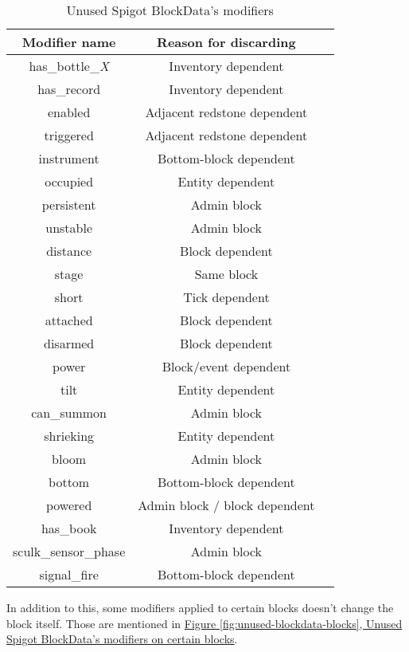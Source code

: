\documentclass[11pt]{article}
\begin{document}
\begin{table}[H]
	\centering
	\begin{tabular}{ |c|c|c| }
		\hline
		Modifier name & Reason for discarding \\
		\hline
		has\_bottle\_\textit{X} & Inventory dependent \\
		has\_record & Inventory dependent \\
		enabled & Adjacent redstone dependent \\
		triggered & Adjacent redstone dependent \\
		instrument & Bottom-block dependent \\
		occupied & Entity dependent \\
		persistent & Admin block \\
		unstable & Admin block \\
		distance & Block dependent \\
		stage & Same block \\
		short & Tick dependent \\
		attached & Block dependent \\
		disarmed & Block dependent \\
		power & Block/event dependent \\
		tilt & Entity dependent \\
		can\_summon & Admin block \\
		shrieking & Entity dependent \\
		bloom & Admin block \\
		bottom & Bottom-block dependent \\
		powered & Admin block / block dependent \\
		has\_book & Inventory dependent \\
		sculk\_sensor\_phase & Admin block \\
		signal\_fire & Bottom-block dependent \\
		\hline
	\end{tabular}
	\caption{Unused Spigot BlockData's modifiers}
	\label{fig:unused-blockdata}
\end{table}

In addition to this, some modifiers applied to certain blocks doesn't change the block itself. Those are mentioned in \hyperref[fig:unused-blockdata-blocks]{Figure \ref{fig:unused-blockdata-blocks}, Unused Spigot BlockData's modifiers on certain blocks}.
\end{document}
